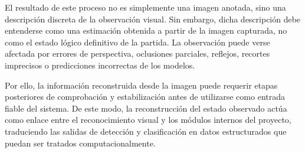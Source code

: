 El resultado de este proceso no es simplemente una imagen anotada, sino una descripción discreta de la observación visual. Sin embargo, dicha descripción debe entenderse como una estimación obtenida a partir de la imagen capturada, no como el estado lógico definitivo de la partida. La observación puede verse afectada por errores de perspectiva, oclusiones parciales, reflejos, recortes imprecisos o predicciones incorrectas de los modelos.

Por ello, la información reconstruida desde la imagen puede requerir etapas posteriores de comprobación y estabilización antes de utilizarse como entrada fiable del sistema. De este modo, la reconstrucción del estado observado actúa como enlace entre el reconocimiento visual y los módulos internos del proyecto, traduciendo las salidas de detección y clasificación en datos estructurados que puedan ser tratados computacionalmente.



